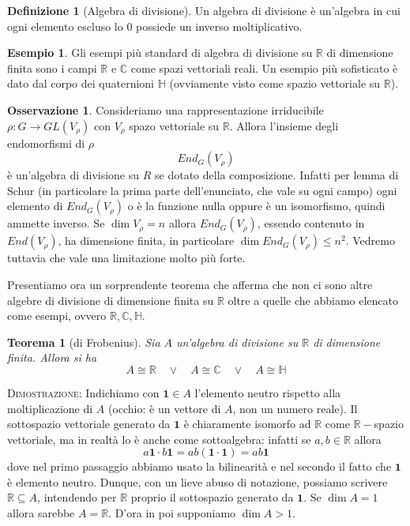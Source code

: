 \documentclass[11pt]{article}
\theoremstyle{plain}
\newtheorem{thm}{Teorema}[section]
\theoremstyle{definition}
\newtheorem{defn}{Definizione}[section]
\newtheorem{exmp}{Esempio}[section]
\newtheorem*{rem}{Osservazione}
\theoremstyle{remark}
\newcommand{\C}{\mathbb{C}}
\newcommand{\R}{\mathbb{R}}
\newcommand{\HH}{\mathbb{H}}
\begin{document}
\begin{defn}[Algebra di divisione]
Un algebra di divisione è un'algebra in cui ogni elemento escluso lo $0$ possiede un inverso moltiplicativo.
\end{defn}

\begin{exmp}
Gli esempi più standard di algebra di divisione su $\R$ di dimensione finita sono i campi $\R$ e $\C$ come spazi vettoriali reali.
Un esempio più sofisticato è dato dal corpo dei quaternioni $\HH$ (ovviamente visto come spazio vettoriale su $\R$).
\end{exmp}


\begin{rem}
Consideriamo una rappresentazione irriducibile $\rho:G\to GL(V_\rho)$ con $V_\rho$ spazo vettoriale su $\R$. Allora l'insieme degli endomorfismi
di $\rho$ 
\[ End_G(V_\rho)\]
è un'algebra di divisione su $R$ se dotato della composizione.
Infatti per lemma di Schur (in particolare la prima parte dell'enunciato, che vale su ogni campo) ogni elemento di $End_G(V_\rho)$ o è la funzione nulla oppure è un isomorfismo, quindi ammette inverso.
Se $\dim V_\rho = n$ allora $End_G(V_\rho)$, essendo contenuto in $End(V_\rho)$, ha dimensione finita, in particolare $\dim End_G(V_\rho)\le n^2$.
Vedremo tuttavia che vale una limitazione molto più forte.
\end{rem}


Presentiamo ora un sorprendente teorema che afferma che non ci sono altre algebre di divisione di dimensione finita su $\R$ oltre a quelle che abbiamo elencato come esempi, ovvero $\R, \C, \HH$.
\begin{thm}[di Frobenius]
\label{thm: frobenius}
Sia $A$ un'algebra di divisione su $\R$ di dimensione finita. Allora si ha 
\[A \cong \R \quad \vee \quad  A \cong \C \quad \vee \quad A  \cong \HH \]
\end{thm}

\textsc{Dimostrazione:}
Indichiamo con $\bm{1}\in A$ l'elemento neutro rispetto alla moltiplicazione di $A$ (occhio: è un vettore di $A$, non un numero reale).
Il sottospazio vettoriale generato da $\bm{1}$ è chiaramente isomorfo ad $\R$ come $\R-$spazio vettoriale, ma in
realtà lo è anche come sottoalgebra: infatti se $a,b\in\R$ allora
\[a\bm{1} \cdot b\bm{1} = ab (\bm{1}\cdot \bm{1}) = ab\bm{1} \]
dove nel primo passaggio abbiamo usato la bilinearità e nel secondo il fatto che $\bm{1}$ è elemento neutro.
Dunque, con un lieve abuso di notazione, possiamo scrivere $\R \subseteq A$, intendendo per $\R$ proprio il sottospazio generato da $\bm{1}$.
Se $\dim A = 1$ allora sarebbe $A=\R$. D'ora in poi supponiamo $\dim A > 1$.
\end{document}
